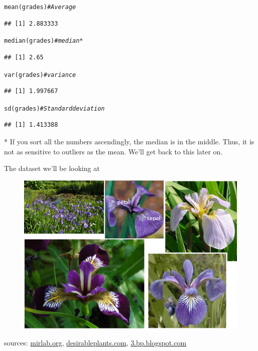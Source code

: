 \documentclass[xcolor=table,           xcolor=dvipsnames]{beamer}\usepackage[]{graphicx}\usepackage[]{color}
\makeatletter
\newcommand{\hlcom}[1]{\textcolor[rgb]{0,0.392,0}{\textit{#1}}}
\newcommand{\hlstd}[1]{\textcolor[rgb]{0,0,0}{#1}}
\newcommand{\hlkwd}[1]{\textcolor[rgb]{0,0,1}{#1}}
\newenvironment{kframe}{%
 \def\at@end@of@kframe{}%
 \ifinner\ifhmode%
  \def\at@end@of@kframe{\end{minipage}}%
  \begin{minipage}{\columnwidth}%
 \fi\fi%
 \def\FrameCommand##1{\hskip\@totalleftmargin \hskip-\fboxsep
 \colorbox{shadecolor}{##1}\hskip-\fboxsep
     \hskip-\linewidth \hskip-\@totalleftmargin \hskip\columnwidth}%
 \MakeFramed {\advance\hsize-\width
   \@totalleftmargin\z@ \linewidth\hsize
   \@setminipage}}%
 {\par\unskip\endMakeFramed%
 \at@end@of@kframe}
\newenvironment{knitrout}{}{} %
\makeatother
\begin{document}
\begin{frame}[fragile]
\begin{knitrout}
\color{fgcolor}\begin{kframe}
\begin{alltt}
\hlkwd{mean}\hlstd{(grades)}   \hlcom{# Average}
\end{alltt}
\begin{verbatim}
## [1] 2.883333
\end{verbatim}
\begin{alltt}
\hlkwd{median}\hlstd{(grades)} \hlcom{# median*}
\end{alltt}
\begin{verbatim}
## [1] 2.65
\end{verbatim}
\begin{alltt}
\hlkwd{var}\hlstd{(grades)}    \hlcom{# variance}
\end{alltt}
\begin{verbatim}
## [1] 1.997667
\end{verbatim}
\begin{alltt}
\hlkwd{sd}\hlstd{(grades)}     \hlcom{# Standard deviation}
\end{alltt}
\begin{verbatim}
## [1] 1.413388
\end{verbatim}
\end{kframe}
\end{knitrout}
* If you sort all the numbers ascendingly, the median is in the middle. Thus, it is not as sensitive to outliers as the mean. We'll get back to this later on.
\end{frame}


\begin{frame}{The dataset we'll be looking at}
  \begin{figure}[h]
    \begin{center}
  	\includegraphics[width=.8\linewidth]{./externalfig/IrisComposition.png}
    \end{center}
  \end{figure}
	sources: \href{http://mirlab.org/jang/books/dcpr/dataSetIris.asp}{mirlab.org},
  \href{http://www.desirableplants.com/images/i/iris_versicolor_mysterious_monique.jpg}{desirableplants.com},
  \href{http://3.bp.blogspot.com/-0dZyClxOh8E/TrFc00J8AcI/AAAAAAAABrA/AJJl4HbMboU/s400/Iris\%2Bsetosa\%2B8.JPG}{3.bp.blogspot.com}
\end{frame}
\end{document}
